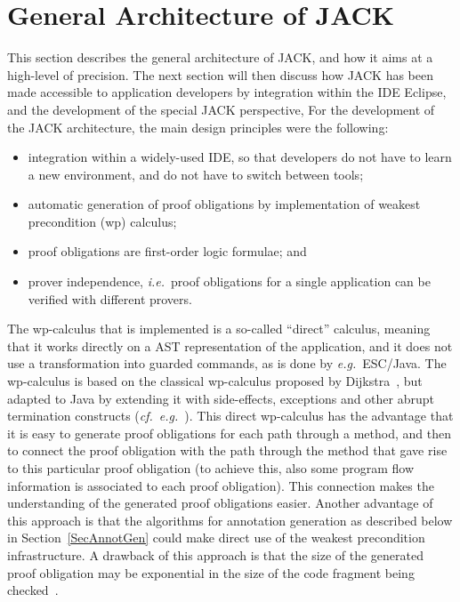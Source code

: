 
\section{General Architecture of JACK}\label{SecArchitecture}

This section describes the general architecture of JACK, and how it
aims at a high-level of precision.  The next section will then discuss
how JACK has been made accessible to application developers by
integration within the IDE Eclipse, and the development of the special
JACK perspective, For the development of the JACK architecture, the
main design principles were the following:
\begin{itemize}
\item integration within a widely-used IDE, so that developers do not
have to learn a new environment, and do not have to switch between tools;
\item automatic generation of proof obligations by
implementation of weakest precondition (wp) calculus;
\item proof obligations are first-order logic formulae; and
\item prover independence, \emph{i.e.}\ proof obligations for
a single application can be verified with different provers.
\end{itemize}

The wp-calculus that is implemented is a
so-called ``direct'' calculus, meaning that it works directly on a AST
representation of the application, and it does not use a
transformation into guarded commands, as is done by \emph{e.g.}\
ESC/Java.  The wp-calculus is based on the classical wp-calculus
proposed by Dijkstra~\cite{Dijkstra75}, but adapted to Java by
extending it with side-effects, exceptions and other abrupt
termination constructs (\emph{cf.}\
\emph{e.g.}~\cite{Jacobs04}). This direct wp-calculus has the advantage
that it is easy to generate proof obligations for each path through a
method, and then to connect the proof obligation with the path through
the method that gave rise to this particular proof obligation (to
achieve this, also some program flow information is associated to each
proof obligation). This connection makes the understanding of the
generated proof obligations easier. Another advantage of this approach
is that the algorithms for annotation generation as described below in
Section~\ref{SecAnnotGen} could make direct use of the weakest
precondition infrastructure. A drawback of this approach is that the
size of the generated proof obligation may be exponential in the size
of the code fragment being checked~\cite{FlanaganS01}.


